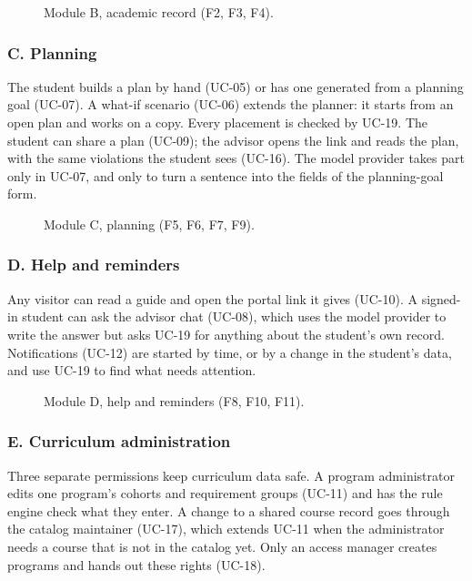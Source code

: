 \documentclass{article}
\begin{document}
\begin{figure}[H]
  \centering
  \par\vspace{6pt}\uclegend
  \caption{Module B, academic record (F2, F3, F4).}
  \label{fig:record}
\end{figure}

\clearpage
\subsubsection{C. Planning}
The student builds a plan by hand (UC-05) or has one generated from a planning goal (UC-07). A what-if scenario (UC-06)
extends the planner: it starts from an open plan and works on a copy. Every placement is checked by UC-19. The student can
share a plan (UC-09); the advisor opens the link and reads the plan, with the same violations the student sees (UC-16).
The model provider takes part only in UC-07, and only to turn a sentence into the fields of the planning-goal form.

\begin{figure}[H]
  \centering
  \par\vspace{6pt}\uclegend
  \caption{Module C, planning (F5, F6, F7, F9).}
  \label{fig:planning}
\end{figure}

\subsubsection{D. Help and reminders}
Any visitor can read a guide and open the portal link it gives (UC-10). A signed-in student can ask the advisor chat
(UC-08), which uses the model provider to write the answer but asks UC-19 for anything about the student's own record.
Notifications (UC-12) are started by time, or by a change in the student's data, and use UC-19 to find what needs
attention.

\begin{figure}[H]
  \centering
  \par\vspace{6pt}\uclegend
  \caption{Module D, help and reminders (F8, F10, F11).}
  \label{fig:help}
\end{figure}

\clearpage
\subsubsection{E. Curriculum administration}
Three separate permissions keep curriculum data safe. A program administrator edits one program's cohorts and requirement
groups (UC-11) and has the rule engine check what they enter. A change to a shared course record goes through the catalog
maintainer (UC-17), which extends UC-11 when the administrator needs a course that is not in the catalog yet. Only an access
manager creates programs and hands out these rights (UC-18).
\end{document}
